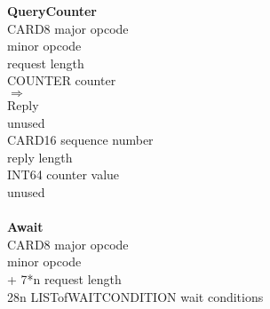 \setlength{\topsep}{0pt}	%
\begin{tabbing}
\tabstopsC
{\bf QueryCounter}\\
		\> CARD8	\> major opcode \\
				\> minor opcode\footnotemark[1] \\
	\> 2			\> request length \\
		\> COUNTER	\> counter \\
$\Rightarrow$\\
	\> 1			\> Reply \\
		\>		\> unused \\
		\> CARD16	\> sequence number \\
				\> reply length \\
		\> INT64	\> counter value \\
		\>		\> unused\\
\\
{\bf Await}\\
		\> CARD8	\> major opcode \\
				\> minor opcode\footnotemark[1] \\
		 + 7*n	\> request length \\
	\> 28n	\> LISTofWAITCONDITION \> wait conditions
\end{tabbing}
\setlength{\topsep}{0pt}	%
